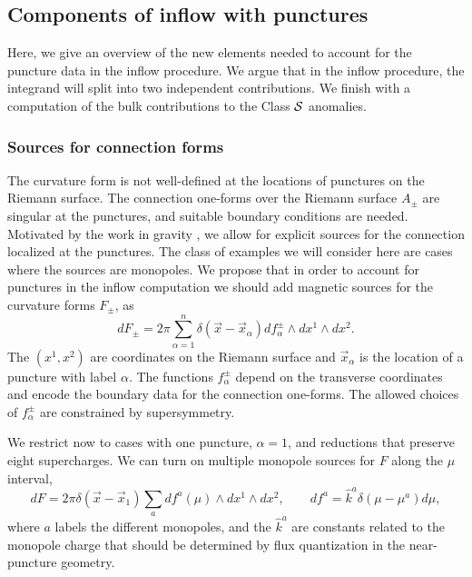 \documentclass[a4paper,11pt]{article}
\def\CS{{\cal S}}
\begin{document}
\subsection{Components of inflow with punctures} 


Here, we give an overview of the new elements needed to account for the puncture data in the inflow procedure. We argue that in the inflow procedure, the integrand will split into two independent contributions. We finish with a computation of the bulk contributions to the Class $\CS$ anomalies. 

\subsubsection*{Sources for connection forms}



The curvature form is not well-defined at the locations of punctures on the Riemann surface.  The connection one-forms over the Riemann surface $A_\pm$ are singular at the punctures, and suitable boundary conditions are needed.  Motivated by the work in gravity \cite{Gaiotto:2009gz,Bah:2015fwa}, we allow for explicit sources for the connection localized at the punctures. The class of examples we will consider here are cases where the sources are monopoles. We propose that in order to account for punctures in the inflow computation we should add magnetic sources for the curvature forms $F_\pm$,  as
\begin{equation}
d F_\pm = 2\pi \sum_{\alpha=1}^n \delta(\vec{x} -\vec{x}_\alpha ) df_\alpha^\pm \wedge dx^1 \wedge dx^2.
\end{equation} The $(x^1,x^2)$ are coordinates on the Riemann surface and $\vec{x}_\alpha$ is the location of a puncture with label $\alpha$.  The functions $f_\alpha^\pm$ depend on the transverse coordinates and encode the boundary data for the connection one-forms.  The allowed choices of $f_\alpha^\pm$ are constrained by supersymmetry.  




We restrict now to cases with one puncture, $\alpha=1$, and reductions that preserve eight supercharges.  We can turn on multiple monopole sources for $F$ along the $\mu$ interval,   
\begin{equation}
d F = 2\pi \delta(\vec{x} -\vec{x}_1 )  \sum_{a} d f^a(\mu) \wedge dx^1 \wedge dx^2, \qquad df^a =   \hat{k}^a \delta\left(\mu -\mu^a\right)d\mu,\label{eq:sourcea}
\end{equation} where $a$ labels the different monopoles, and the $\hat{k}^a$ are constants related to the monopole charge that should be determined by flux quantization in the near-puncture geometry.   
\end{document}
